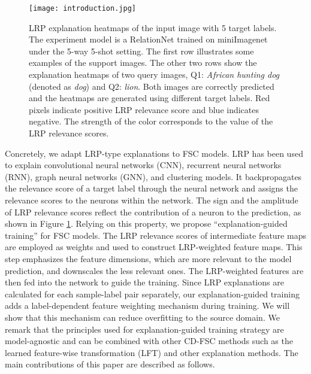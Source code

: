 \documentclass[a4paper,conference]{IEEEtran}
\begin{document}
\begin{figure}[tb]
    \centering
    \texttt{[image: introduction.jpg]}
    \caption{LRP explanation heatmaps of the input image with 5 target labels. The experiment model is a RelationNet trained on miniImagenet under the 5-way 5-shot setting. The first row illustrates some examples of the support images. The other two rows show the explanation heatmaps of two query images, Q1: \textit{African hunting dog} (denoted as \textit{dog}) and Q2: \textit{lion}. Both images are correctly predicted and the heatmaps are generated using different target labels. Red pixels indicate positive LRP relevance score and blue indicates negative. The strength of the color corresponds to the value of the LRP relevance scores.}
    \label{fig:introLRPexample}
\end{figure}
Concretely, we adapt LRP-type explanations\cite{LRP:bach2015pixel} to FSC models. LRP has been used to explain convolutional neural networks (CNN)\cite{LRP:bach2015pixel}, recurrent neural networks (RNN)\cite{LRP-LSTM:arras2017explaining}, graph neural networks (GNN)\cite{GNNLRP:schnake2020xai}, and clustering models\cite{Explainkmeans:kauffmann2019clustering}. 
It backpropagates the relevance score of a target label through the neural network and assigns the relevance scores to the neurons within the network. The sign and the amplitude of LRP relevance scores reflect the contribution of a neuron to the prediction, as shown in Figure \ref{fig:introLRPexample}. Relying on this property, we propose ``explanation-guided training'' for FSC models. The LRP relevance scores of intermediate feature maps are employed as weights and used to construct LRP-weighted feature maps. This step emphasizes the feature dimensions, which are more relevant to the model prediction, and downscales the less relevant ones. 
The LRP-weighted features are then fed into the network to guide the training. 
Since LRP explanations are calculated for each sample-label pair separately, our explanation-guided training adds a label-dependent feature weighting mechanism during training. We will show that this mechanism can reduce overfitting to the source domain. 
We remark that the principles used for explanation-guided training strategy are model-agnostic and can be combined with other CD-FSC methods such as the learned feature-wise transformation (LFT) \cite{FeaturewiseTranslayer:tseng2020cross} and other explanation methods. 
The main contributions of this paper are described as follows.
\end{document}
